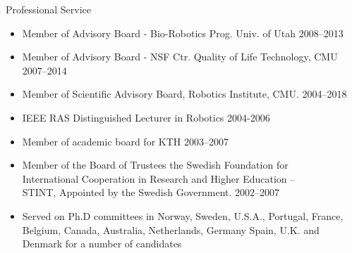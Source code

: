 \documentclass{article}
\begin{document}
\begin{cv}
\begin{cvlist}{Professional Service}
\begin{itemize}
    \item Member of Advisory Board - Bio-Robotics Prog. Univ. of Utah
          \cftdotfill{\cftdotsep} 2008--2013
    \item Member of Advisory Board - NSF Ctr. Quality of Life Technology, CMU
          \cftdotfill{\cftdotsep} 2007--2014
    \item Member of Scientific Advisory Board, Robotics Institute, CMU.
          \cftdotfill{\cftdotsep} 2004--2018
    \item IEEE RAS Distinguished Lecturer in Robotics \cftdotfill{\cftdotsep}
          2004-2006
    \item Member of academic board for KTH \cftdotfill{\cftdotsep} 2003--2007
    \item Member of the Board of Trustees the Swedish Foundation for\\
      International Cooperation in Research and Higher Education --\\
          STINT, Appointed by the Swedish Government. \cftdotfill{\cftdotsep}
          2002--2007
    \item Served on Ph.D committees in Norway, Sweden, U.S.A., Portugal, France,
          Belgium, Canada, Australia, Netherlands, Germany Spain, U.K. and
          Denmark for a number of candidates
  \end{itemize}


\end{cvlist}
\end{cv}
\end{document}
